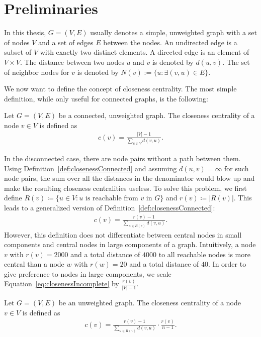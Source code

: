 \chapter{Preliminaries}
\label{ch:preliminaries}

In this thesis, $G = (V, E)$ usually denotes a simple, unweighted graph with a set of nodes $V$ and a set of edges $E$ between the nodes. An undirected edge is a subset of $V$ with exactly two distinct elements. A directed edge is an element of $V \times V$. The distance between two nodes $u$ and $v$ is denoted by $d(u, v)$. The set of neighbor nodes for $v$ is denoted by $N(v) := \{u : \exists (v, u) \in E\}$.

We now want to define the concept of closeness centrality. The most simple definition, while only useful for connected graphs, is the following:

\begin{definition}
\label{def:closenessConnected}
Let $G = (V, E)$ be a connected, unweighted graph. The closeness centrality of a node $v \in V$ is defined as
\begin{align*}
	c(v) = \frac{|V| - 1}{\sum_{u \in V}{d(v, u)}}.
\end{align*}
\end{definition}

In the disconnected case, there are node pairs without a path between them. Using Definition~\ref{def:closenessConnected} and assuming $d(u, v) = \infty$ for such node pairs, the sum over all the distances in the denominator would blow up and make the resulting closeness centralities useless. To solve this problem, we first define $R(v) \coloneqq \{u \in V : u \text{ is reachable from }v \text{ in } G\}$ and $r(v) \coloneqq |R(v)|$. This leads to a generalized version of Definition~\ref{def:closenessConnected}:
\begin{align}
	c(v) = \frac{r(v) - 1}{\sum_{u \in R(v)}{d(v, u)}}. \label{eq:closenessIncomplete}
\end{align}
However, this definition does not differentiate between central nodes in small components and central nodes in large components of a graph. Intuitively, a node $v$ with $r(v) = 2000$ and a total distance of $4000$ to all reachable nodes is more central than a node $w$ with $r(w) = 20$ and a total distance of $40$. In order to give preference to nodes in large components, we scale Equation~\ref{eq:closenessIncomplete} by $\frac{r(v)}{|V| - 1}$. 

\begin{definition}
\label{def:closenessGeneral}
Let $G = (V, E)$ be an unweighted graph. The closeness centrality of a node $v \in V$ is defined as
\begin{align*}
	c(v) = \frac{r(v) - 1}{\sum_{u \in R(v)}{d(v, u)}} \cdot \frac{r(v)}{n - 1}.
\end{align*}
\end{definition}

